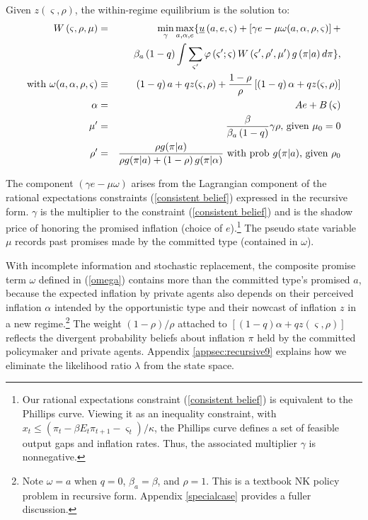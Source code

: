 \documentclass[12pt,letter,leqno]{article}
\theoremstyle{asn}
\theoremstyle{lem}
\theoremstyle{slem}
\theoremstyle{prop}
\theoremstyle{appprop}
\theoremstyle{rem}
\theoremstyle{defn}
\begin{document}
\begin{prop}\label{prop:W}%

Given $z(\varsigma ,\rho)$, the within-regime equilibrium is the solution to:
\begin{eqnarray}
W\left( \varsigma ,\rho ,\mu \right) &=&\min_{\gamma }\max_{a,\alpha
,e}\{\underline{u}\left( a,e,\varsigma \right) +\left[ \gamma e -\mu \omega(a,\alpha,\rho,\varsigma)
\right] +  \label{W} \\
&&\beta_{a}\left( 1-q\right) \int \sum_{\varsigma ^{\prime }}\varphi \left(
\varsigma ^{\prime };\varsigma \right) W\left( \varsigma ^{\prime },\rho
^{\prime },\mu ^{\prime }\right) g\left( \pi |a\right) d\pi \}, \notag \\
\text{with } \omega(a,\alpha,\rho,\varsigma) &\equiv& \left( 1-q\right) a+qz(\varsigma ,\rho)+\frac{1-\rho }{%
\rho }\left[ \left( 1-q\right) \alpha +qz (\varsigma ,\rho)\right]  \label{omega} \\
\alpha &=& Ae+B\left( \varsigma \right) \\
\mu ^{\prime } &=&\frac{\beta }{\beta_{a}\left( 1-q\right) }\gamma \rho 
\text{, given }\mu _{0}=0  \label{mup} \\
\rho ^{\prime } &=&\frac{\rho g(\pi|a) }{\rho g(\pi|a) +\left( 1-\rho
\right) g(\pi|\alpha)} \text{ with prob $g(\pi|a)$, given $\rho_0$}  \label{rhop}
\end{eqnarray}
\end{prop}%


The component $\left( \gamma e-\mu \omega \right) $ arises from the Lagrangian component of the rational expectations constraints (\ref{consistent belief}) expressed in the recursive form. $\gamma$ is the multiplier to the constraint (\ref{consistent belief}) and is the shadow price of honoring the promised inflation (choice of $e$).\footnote{Our rational expectations constraint (\ref{consistent belief}) is equivalent to the Phillips curve. Viewing it as an inequality constraint, with $x_t \leq (\pi_t- \beta E_t\pi_{t+1}-\varsigma_t)/\kappa$, the Phillips curve defines a set of feasible output gaps and inflation rates. Thus, the associated multiplier $\gamma$ is nonnegative.} The pseudo state variable $\mu $ records past promises made by the committed type (contained in $\omega$).

With incomplete information and stochastic replacement, the composite promise term $\omega$ defined in (\ref{omega}) contains more than the committed type's promised $a$, because the expected inflation by private agents also depends on their perceived inflation $\alpha $ intended by the opportunistic
type and their nowcast of inflation $z$ in a new regime.\footnote{Note $\omega=a$ when $q=0$, $\beta_a=\beta$, and $\rho=1$. This is a textbook NK policy problem in recursive form. Appendix \ref{specialcase} provides a fuller discussion.} 
The weight $(1-\rho)/\rho$ attached to $[(1-q)\alpha+qz(\varsigma,\rho)]$ reflects the divergent probability beliefs about inflation $\pi$ held by the committed policymaker and private agents. Appendix \ref{appsec:recursive9} explains how we eliminate the likelihood ratio $\lambda$ from the state space.
\end{document}

